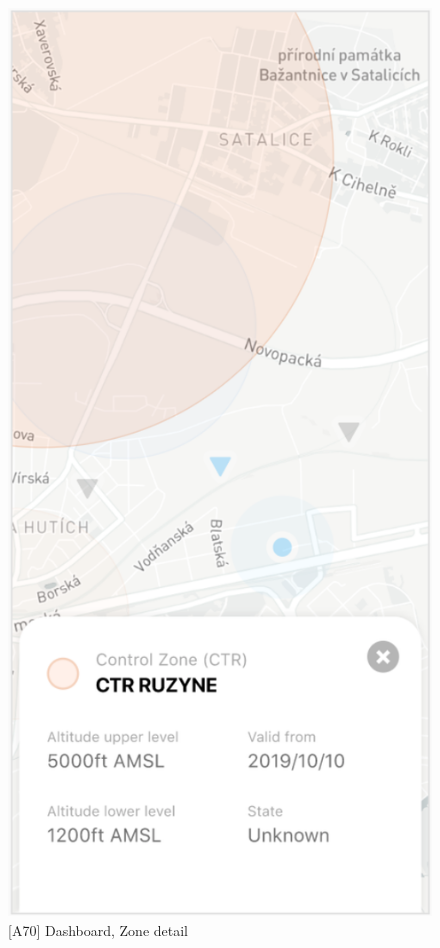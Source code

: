 \begin{figure}
    \centering
    \begin{minipage}{.45\textwidth}
        \centering
        \includegraphics[width=.7\linewidth]{assets/user_interface_design/dashboard/dashboard_zone_detail.png}
        \caption{[A70] Dashboard, Zone detail}
        \label{fig:dashboard_zone_detail}
    \end{minipage}%
    \hspace{.05\linewidth}
    \begin{minipage}{.45\textwidth}
        \centering

\end{minipage}
\end{figure}
